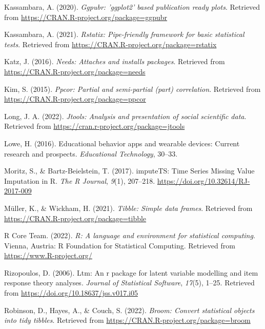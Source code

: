 \documentclass[
  man]{apa6}
\newlength{\cslhangindent}
\newlength{\cslentryspacingunit} %
\newenvironment{CSLReferences}[2] %
 {%
  \setlength{\parindent}{0pt}
  \ifodd #1
  \let\oldpar\par
  \def\par{\hangindent=\cslhangindent\oldpar}
  \fi
  \setlength{\parskip}{#2\cslentryspacingunit}
 }%
 {}
\begin{document}
\begin{CSLReferences}{1}{0}
\leavevmode{}%
Kassambara, A. (2020). \emph{Ggpubr: 'ggplot2' based publication ready plots}. Retrieved from \url{https://CRAN.R-project.org/package=ggpubr}

\leavevmode{}%
Kassambara, A. (2021). \emph{Rstatix: Pipe-friendly framework for basic statistical tests}. Retrieved from \url{https://CRAN.R-project.org/package=rstatix}

\leavevmode{}%
Katz, J. (2016). \emph{Needs: Attaches and installs packages}. Retrieved from \url{https://CRAN.R-project.org/package=needs}

\leavevmode{}%
Kim, S. (2015). \emph{Ppcor: Partial and semi-partial (part) correlation}. Retrieved from \url{https://CRAN.R-project.org/package=ppcor}

\leavevmode{}%
Long, J. A. (2022). \emph{Jtools: Analysis and presentation of social scientific data}. Retrieved from \url{https://cran.r-project.org/package=jtools}

\leavevmode{}%
Lowe, H. (2016). Educational behavior apps and wearable devices: Current research and prospects. \emph{Educational Technology}, 30--33.

\leavevmode{}%
Moritz, S., \& Bartz-Beielstein, T. (2017). {imputeTS: Time Series Missing Value Imputation in R}. \emph{{The R Journal}}, \emph{9}(1), 207--218. \url{https://doi.org/10.32614/RJ-2017-009}

\leavevmode{}%
Müller, K., \& Wickham, H. (2021). \emph{Tibble: Simple data frames}. Retrieved from \url{https://CRAN.R-project.org/package=tibble}

\leavevmode{}%
R Core Team. (2022). \emph{R: A language and environment for statistical computing}. Vienna, Austria: R Foundation for Statistical Computing. Retrieved from \url{https://www.R-project.org/}

\leavevmode{}%
Rizopoulos, D. (2006). Ltm: An r package for latent variable modelling and item response theory analyses. \emph{Journal of Statistical Software}, \emph{17}(5), 1--25. Retrieved from \url{https://doi.org/10.18637/jss.v017.i05}

\leavevmode{}%
Robinson, D., Hayes, A., \& Couch, S. (2022). \emph{Broom: Convert statistical objects into tidy tibbles}. Retrieved from \url{https://CRAN.R-project.org/package=broom}


\end{CSLReferences}
\end{document}
